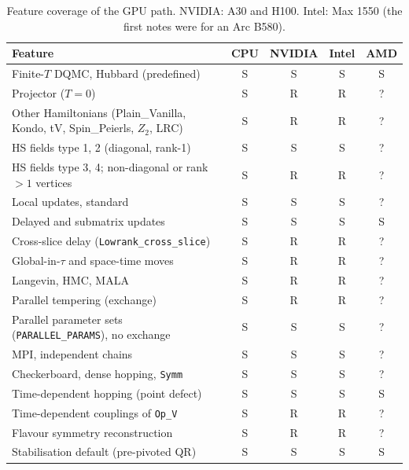 \begin{table}[h]
\centering
\caption{Feature coverage of the GPU path. NVIDIA: A30 and H100. Intel: Max 1550 (the first notes were for an Arc B580).}
\label{tab:features}
\small
\begin{tabular}{@{}p{6.1cm}cccc@{}}
\toprule
Feature & CPU & NVIDIA & Intel & AMD \\
\midrule
Finite-$T$ DQMC, Hubbard (predefined) & S & S & S & S \\ %
Projector ($T=0$) & S & R & R & ? \\ %
Other Hamiltonians (Plain\_Vanilla, Kondo, tV, Spin\_Peierls, $Z_2$, LRC) & S & R & R & ? \\ %
HS fields type 1, 2 (diagonal, rank-1) & S & S & S & ? \\ %
HS fields type 3, 4; non-diagonal or rank $>1$ vertices & S & R & R & ? \\ %
Local updates, standard & S & S & S & ? \\ %
Delayed and submatrix updates & S & S & S & S \\ %
Cross-slice delay (\texttt{Lowrank\_cross\_slice}) & S & R & R & ? \\ %
Global-in-$\tau$ and space-time moves & S & R & R & ? \\ %
Langevin, HMC, MALA & S & R & R & ? \\ %
Parallel tempering (exchange) & S & R & R & ? \\ %
Parallel parameter sets (\texttt{PARALLEL\_PARAMS}), no exchange & S & S & S & ? \\ %
MPI, independent chains & S & S & S & ? \\ %
Checkerboard, dense hopping, \texttt{Symm} & S & S & S & ? \\ %
Time-dependent hopping (point defect) & S & S & S & S \\ %
Time-dependent couplings of \texttt{Op\_V} & S & R & R & ? \\ %
Flavour symmetry reconstruction & S & R & R & ? \\ %
Stabilisation default (pre-pivoted QR) & S & S & S & S \\ %

\end{tabular}
\end{table}
